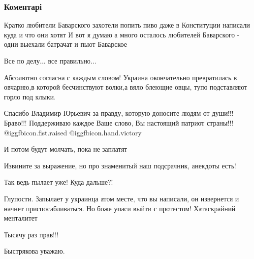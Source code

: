 
 
 
 
 
\subsubsection{Коментарі}
\label{sec:24_10_2021.fb.fb_group.titarenko_vremja_mira.1.bystrjakov_ukraincy.cmt}

\begin{itemize} %

Кратко любители Баварского захотели попить пиво даже в Конституции написали
куда и что они хотят И вот я думаю а много осталось любителей Баварского - одни
выехали батрачат и пьют Баварское

Все по делу... все правильно...


Абсолютно согласна с каждым словом! Украина окончательно превратилась в
овчарню,в которой бесчинствуют волки,а вяло блеющие овцы, тупо подставляют
горло под клыки.


Спасибо Владимир Юрьевич за правду, которую доносите людям от души!!! Браво!!!
Поддерживаю каждое Ваше слово, Вы настоящий патриот страны!!! @igg{fbicon.fist.raised} @igg{fbicon.hand.victory}

И потом будут молчать, пока не заплатят

Извините за выражение, но про знаменитый наш подсрачник, анекдоты есть!

Так ведь пылает уже! Куда дальше?!


Глупости. Запылает у украинца атом месте, что вы написали, он извернется и
начнет приспосабливаться. Но боже упаси выйти с протестом! Хатаскрайний
менталитет

Тысячу раз прав!!!

Быстрякова уважаю.


\end{itemize} %
